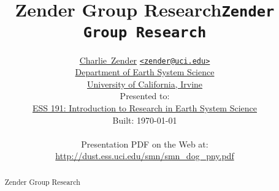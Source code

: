 \documentclass[12pt]{article}
\begin{document}

\begin{screen}
\title{\color{section0}\Huge Zender Group Research}
\end{screen}

\begin{print}
\title{\Huge\texttt{Zender Group Research}}
\end{print}

\author{
\color{section1}
\href{http://www.ess.uci.edu/~zender}{Charlie~Zender}
{\href{mailto:zender@uci.edu}{\color{section1}\texttt{<zender@uci.edu>}}}\\ 
\href{http://www.ess.uci.edu}{Department of Earth System Science}\\
\href{http://www.uci.edu}{University of California, Irvine}\\
Presented to:\\
\href{http://eee.uci.edu/05f/42132}{ESS 191: Introduction to Research in Earth System Science}\\
Built: \today\\
\\
Presentation PDF on the Web at:\\
\url{http://dust.ess.uci.edu/smn/smn_dog_pny.pdf}
} %


\date{} %
\maketitle
\begin{screen}
\vfill
\end{screen}
\clearpage

\begin{abstract}
\Large
\setlength{\baselineskip}{12.0pt} %
\noindent Zender Group Research
\end{abstract}
\clearpage

\begin{print}
\tableofcontents
\end{print}
\begin{screen}
\vfill
\end{screen}

\Large
\end{document}
